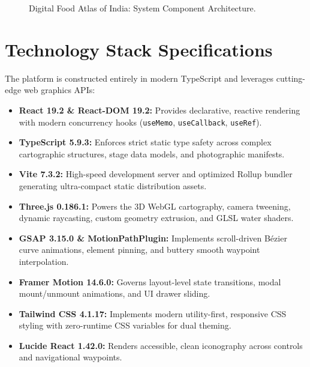 \documentclass[11pt,a4paper]{report}
\begin{document}
\begin{figure}[ht]
    \caption{Digital Food Atlas of India: System Component Architecture.}
    \label{fig:sys_arch}
\end{figure}

\section{Technology Stack Specifications}
The platform is constructed entirely in modern TypeScript and leverages cutting-edge web graphics APIs:
\begin{itemize}
    \item \textbf{React 19.2 \& React-DOM 19.2:} Provides declarative, reactive rendering with modern concurrency hooks (\texttt{useMemo}, \texttt{useCallback}, \texttt{useRef}).
    \item \textbf{TypeScript 5.9.3:} Enforces strict static type safety across complex cartographic structures, stage data models, and photographic manifests.
    \item \textbf{Vite 7.3.2:} High-speed development server and optimized Rollup bundler generating ultra-compact static distribution assets.
    \item \textbf{Three.js 0.186.1:} Powers the 3D WebGL cartography, camera tweening, dynamic raycasting, custom geometry extrusion, and GLSL water shaders.
    \item \textbf{GSAP 3.15.0 \& MotionPathPlugin:} Implements scroll-driven Bézier curve animations, element pinning, and buttery smooth waypoint interpolation.
    \item \textbf{Framer Motion 14.6.0:} Governs layout-level state transitions, modal mount/unmount animations, and UI drawer sliding.
    \item \textbf{Tailwind CSS 4.1.17:} Implements modern utility-first, responsive CSS styling with zero-runtime CSS variables for dual theming.
    \item \textbf{Lucide React 1.42.0:} Renders accessible, clean iconography across controls and navigational waypoints.
\end{itemize}
\end{document}
